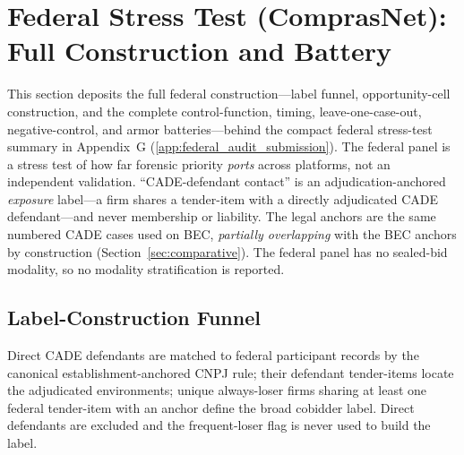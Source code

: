 \section{Federal Stress Test (ComprasNet): Full Construction and Battery}
\label{supp:federal}

This section deposits the full federal construction---label funnel,
opportunity-cell construction, and the complete control-function, timing,
leave-one-case-out, negative-control, and armor batteries---behind the
compact federal stress-test summary in Appendix~G
(\ref{app:federal_audit_submission}). The federal panel is a stress test of
how far forensic priority \emph{ports} across platforms, not an independent
validation. ``CADE-defendant contact'' is an adjudication-anchored
\emph{exposure} label---a firm shares a tender-item with a directly
adjudicated CADE defendant---and never membership or liability. The legal
anchors are the same numbered CADE cases used on BEC, \emph{partially
overlapping} with the BEC anchors by construction
(Section~\ref{sec:comparative}). The federal panel has no sealed-bid
modality, so no modality stratification is reported.

\subsection{Label-Construction Funnel}
\label{supp:federal_funnel}

Direct CADE defendants are matched to federal participant records by the
canonical establishment-anchored CNPJ rule; their defendant tender-items
locate the adjudicated environments; unique always-loser firms sharing at
least one federal tender-item with an anchor define the broad cobidder
label. Direct defendants are excluded and the frequent-loser flag is never
used to build the label.

